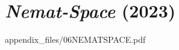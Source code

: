 \chapter{\textit{Nemat-Space} (2023)}

        
            {appendix_files/06NEMATSPACE.pdf}
    


